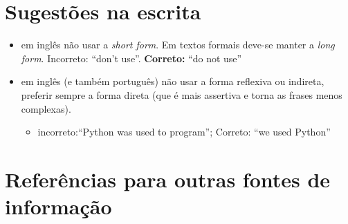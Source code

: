 \section{Sugestões na escrita}
\begin{itemize}
  \item em inglês não usar a \emph{short form}. Em textos formais deve-se manter a \emph{long form}. Incorreto: ``don't use''. \textbf{Correto:} ``do not use''
  \item em inglês (e também português) não usar a forma reflexiva ou indireta, preferir sempre a forma direta (que é mais assertiva e torna as frases menos complexas).
     \begin{itemize}
        \item incorreto:``Python was used to program''; Correto: ``we used Python''
     \end{itemize}
\end{itemize}

\section{Referências para outras fontes de informação}

